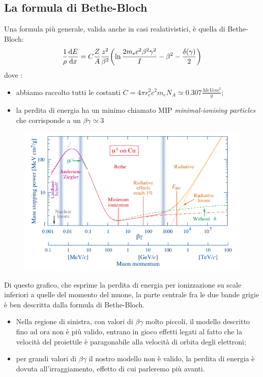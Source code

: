 \subsection{La formula di Bethe-Bloch}
Una formula più generale, valida anche in casi realativistici, è quella di Bethe-Bloch:
\begin{align*}
    \frac{1}{\rho}\frac{\dd{E}}{\dd{x}} = C\frac{Z}{A}\frac{z^2}{\beta^2}\qty(\ln{\frac{2m_{e}c^2\beta^2\gamma^2}{I}}-\beta^2-\frac{\delta(\gamma)}{2})
\end{align*}
dove : 
\begin{itemize}
        \item abbiamo raccolto tutti le costanti $C=4\pi r_{e}^2c^2m_{e}N_{A} \simeq 0.307\frac{MeVcm^2}{g}$;
        \item la perdita di energia ha un minimo chiamato MIP \textit{ minimal-ionising particles } che 
                corrisponde a un $\beta\gamma \simeq 3$
\end{itemize}
\begin{figure}[!h]
    \centering
    \includegraphics[scale=0.5]{ch6InterazioneMateria/BetheCompleta}
\end{figure}
Di questo grafico, che esprime la perdita di energia per ionizzazione su scale inferiori a quelle del momento del muone, 
la parte centrale fra le due bande grigie è ben descritta dalla formula di Bethe-Bloch.
\begin{itemize}
        \item Nella regione di sinistra, con valori di $\beta\gamma$ molto piccoli, il modello descritto fino ad ora non è 
                più valido, entrano in gioco effetti legati al fatto che la velocità del proiettile è paragonabile
                alla velocità di orbita degli elettroni;
        \item per grandi valori di $\beta\gamma$ il nostro modello non è valido, la perdita di energia è dovuta all'irraggiamento, 
                effetto di cui parleremo più avanti.
\end{itemize}
